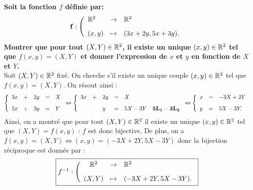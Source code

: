 \documentclass[a4paper, 11pt,reqno]{article}
\begin{document}
\begin{correction}   \;
\textbf{Soit la fonction $f$ d\'efinie par: }
$$\mathbf{f : \left( \begin{array}{llll}
\R^{2} & \rightarrow & \R^2\vsec\\
(x,y) & \mapsto & (3x+2y, 5x+3y). 
 \end{array}\right.}
$$
\textbf{Montrer que pour tout $(X,Y) \in \mathbb{R}^2$, il existe un unique $(x,y) \in \mathbb{R}^2$ tel que $f(x,y) = (X,Y)$ et donner l'expression de $x$ et $y$ en fonction de $X$ et $Y$.}\\
Soit $(X,Y)\in\mathbb{R}^2$ fix\'e. On cherche s'il existe un unique couple $(x,y)\in\mathbb{R}^2$ tel que $f(x,y)=(X,Y)$.
On r\'esout ainsi :
$$\left\lbrace \begin{array}{lllll}
3x&+&2y&=&X\vsec\\
5x&+&3y&=&Y
\end{array}\right.
\Leftrightarrow 
\left\lbrace \begin{array}{llllll}
3x&+&2y&=&X\vsec\\
&&y&=&5X-3Y & \mathbf{5L_1-3L_2}
\end{array}\right.
\Leftrightarrow 
\left\lbrace  \begin{array}{lll}
x&=& -3X+2Y\vsec\\
y&=& 5X-3Y.
\end{array}\right.$$
Ainsi, on a montr\'e que pour tout $(X,Y) \in \mathbb{R}^2$ il existe un unique $(x,y) \in \mathbb{R}^2$ tel que $(X,Y)=f(x,y)$ : $f$ est donc bijective. De plus, on a $f(x,y) = (X,Y) \Leftrightarrow (x,y) = (-3X+2Y,5X-3Y)$ donc la bijection r\'eciproque est donn\'ee par :  
$$\fbox{$f^{-1}:  \left(\begin{array}{ccl}
\R^2 & \rightarrow & \R^2\vsec\\
 (X,Y) & \mapsto & (-3X+2Y, 5X-3Y).
  \end{array}\right.$}$$
\end{correction}
\end{document}
